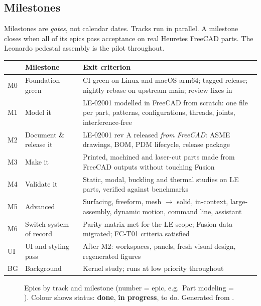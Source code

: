 \subsection{Milestones}

Milestones are \emph{gates}, not calendar dates. Tracks run in parallel. A milestone closes when all of its
epics pass acceptance on real Heuretes FreeCAD parts. The Leonardo pedestal assembly  is the pilot
throughout.

\begin{center}
\small
\begin{tabularx}{\linewidth}{@{}lp{4.3cm}X@{}}
\toprule
& Milestone & Exit criterion\\
\midrule
M0 & Foundation green & CI green on Linux and macOS arm64; tagged release; nightly rebase on upstream main; review fixes in\\
M1 & Model it & LE-02001 modelled in FreeCAD from scratch: one file per part, patterns, configurations, threads, joints, interference-free\\
M2 & Document \& release it & LE-02001 rev A released \emph{from FreeCAD}: ASME drawings, BOM, PDM lifecycle, release package\\
M3 & Make it & Printed, machined and laser-cut parts made from FreeCAD outputs without touching Fusion\\
M4 & Validate it & Static, modal, buckling and thermal studies on LE parts, verified against benchmarks\\
M5 & Advanced & Surfacing, freeform, mesh $\rightarrow$ solid, in-context, large-assembly, dynamic motion, command line, assistant\\
M6 & Switch system of record & Parity matrix met for the LE scope; Fusion data migrated; FC-T01 criteria satisfied\\
UI & UI and styling pass & After M2: workspaces, panels, fresh visual design, regenerated figures\\
BG & Background & Kernel study; runs at low priority throughout\\
\bottomrule
\end{tabularx}
\end{center}

\begin{figure}[ht]
\centering

\caption{Epics by track and milestone (number = epic, e.g.\ Part modeling  = ).
Colour shows status: \textcolor{bwgreen}{\textbf{done}}, \textcolor{bworange}{\textbf{in progress}}, to do.
Generated from .}
\label{fig:swim}
\end{figure}


